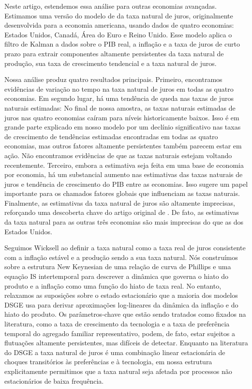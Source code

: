 \documentclass[11pt,oneside,a4paper]{article}
\begin{document}
Neste artigo, estendemos essa análise para outras economias avançadas. Estimamos uma versão do modelo de \citet{LW:2003} da taxa natural de juros, originalmente desenvolvida para a economia americana, usando dados de quatro economias: Estados Unidos, Canadá, Área do Euro e Reino Unido. Esse modelo aplica o filtro de Kalman a dados sobre o PIB real, a inflação e a taxa de juros de curto prazo para extrair componentes altamente persistentes da taxa natural de produção, sua taxa de crescimento tendencial e a taxa natural de juros.

Nossa análise produz quatro resultados principais. Primeiro, encontramos evidências de variação no tempo na taxa natural de juros em todas as quatro economias. Em segundo lugar, há uma tendência de queda nas taxas de juros naturais estimadas: No final de nossa amostra, as taxas naturais estimadas de juros nas quatro economias caíram para níveis historicamente baixos. Isso é em grande parte explicado em nosso modelo por um declínio significativo nas taxas de crescimento de tendências estimadas encontradas em todas as quatro economias, mas outros fatores altamente persistentes também parecem estar em ação. Não encontramos evidências de que as taxas naturais estejam voltando recentemente. Terceiro, embora a estimativa seja feita em uma base de economia por economia, há um substancial aumento nas estimativas das taxas naturais de juros e tendência de crescimento do PIB entre as economias. Isso sugere um papel importante para os chamados fatores globais que influenciam as taxas naturais. Finalmente, as estimativas da taxa natural de juros são altamente imprecisas, reforçando uma descoberta chave do artigo original de \citet{LW:2003}. De fato, as estimativas da taxa natural para as outras três economias são mais imprecisas do que as dos Estados Unidos.

Seguimos Wicksell ao definir a taxa natural como a taxa real de juros consistente com a inflação estável e a produção sendo a sua taxa natural. Nós construímos sobre a estrutura New Keynesian de uma relação de curva de Phillips e uma equação IS intertemporal para descrever a dinâmica que governa o hiato do produto e a inflação como uma função do hiato de taxa real. No entanto, relaxamos as suposições sobre o estado estacionário que a maioria dos modelos DSGE usa para derivar aproximações log-lineares da dinâmica da inflação e do hiato do produto. Os parâmetros-chave que estão sendo tratados como fixados na literatura, como a taxa de crescimento da tecnologia e a taxa de preferência temporal do agregado familiar representativo, podem, de fato, estar sujeitos a flutuações altamente persistentes, mas difíceis de detectar. Enquanto na literatura do DSGE a taxa natural de juros é uma combinação linear estacionária de choques transitórios às preferências e à tecnologia, em nossa estrutura explicitamente permitimos que a taxa natural seja afetada por processos não estacionários de baixa frequência.
\end{document}
